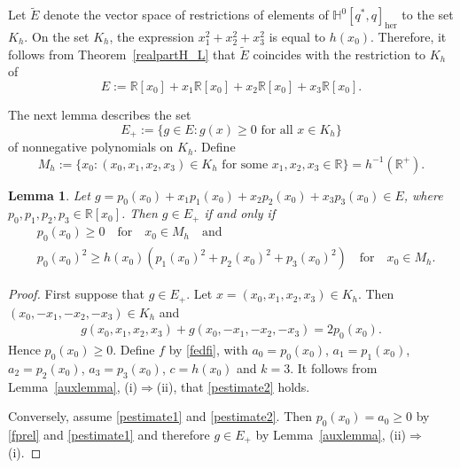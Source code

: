 \documentclass[11pt,a4paper]{amsart}
\newtheorem{lemma}[theorem]{Lemma}
\theoremstyle{definition}
\begin{document}
Let $\widetilde{E}$ denote the vector space of restrictions of elements
of $\mathbb{H}^{0}[q^{*},q]_{\mathrm{her}}$ to the set $K _{h}$. On the
set $K_{h}$, the expression $x_{1}^{2}+x_{2}^{2}+x_{3}^{2}$ is equal to
$h(x_{0})$. Therefore, it follows from Theorem~\ref{realpartH_L} that
$\widetilde{E}$ coincides with the restriction to $K_{h}$ of
%
\begin{equation*}
E:=\mathbb{R}[x_{0}]+x_{1}\mathbb{R}[x_{0}]+x_{2}\mathbb{R}[x_{0}]+x_{3}
\mathbb{R}[x_{0}].
\end{equation*}

The next lemma describes the set
%
\begin{equation*}
E_{+}:=\{ g\in E: g(x)\geq 0 \text{ for all } x\in K_{h}\}
\end{equation*}
%
of nonnegative polynomials on $K_{h}$. Define
%
\begin{equation*}
M_{h}:=\{ x_{0}: (x_{0},x_{1},x_{2},x_{3}) \in K_{h}
\text{ for some } x_{1},x_{2},x_{3}\in \mathbb{R}\}=h^{-1}(\mathbb{R}^{+}).
\end{equation*}

\begin{lemma}%
\label{positiveE}
Let
$g=p_{0}(x_{0})+x_{1}p_{1}(x_{0})+x_{2}p_{2}(x_{0})+x_{3}p_{3}(x_{0})
\in E$, where $p_{0},p_{1},p_{2},p_{3}\in \mathbb{R}[x_{0}]$. Then
$g\in E_{+}$ if and only if
%
\begin{align}
& p_{0}(x_{0}) \geq 0\quad \text{for}\quad x_{0}\in M_{h} \quad
\text{and}
\label{pestimate1}
\\
& p_{0}(x_{0})^{2}\geq h(x_{0})(p_{1}(x_{0})^{2}+p_{2}(x_{0})^{2}+p_{3}(x_{0})^{2})
\quad \text{for}\quad x_{0}\in M_{h}.
\label{pestimate2}
\end{align}
%
\end{lemma}

\begin{proof}
First suppose that $g\in E_{+}$. Let
$x=(x_{0},x_{1},x_{2},x_{3})\in K_{h}$. Then
$(x_{0},-x_{1},-x_{2},\allowbreak -x_{3})\in K_{h}$ and
%
\begin{align}
\label{fprel}
g(x_{0},x_{1},x_{2},x_{3})+g(x_{0},-x_{1},-x_{2},-x_{3})=2p_{0}(x_{0}).
\end{align}
%
Hence $p_{0}(x_{0})\geq 0$. Define $f$ by \eqref{fedfi}, with
$a_{0}=p_{0}(x_{0})$, $a_{1}=p_{1}(x_{0})$, $a_{2}=p_{2}(x_{0})$,
$a_{3}=p_{3}(x_{0})$, $c=h(x_{0})$ and $k=3$. It follows from Lemma~\ref{auxlemma}, (i)$\Rightarrow $(ii), that \eqref{pestimate2} holds.

Conversely, assume \eqref{pestimate1} and \eqref{pestimate2}. Then
$p_{0}(x_{0})=a_{0}\geq 0$ by \eqref{fprel} and \eqref{pestimate1} and
therefore $g\in E_{+}$ by Lemma~\ref{auxlemma}, (ii)$\Rightarrow $(i).
\end{proof}
\end{document}
